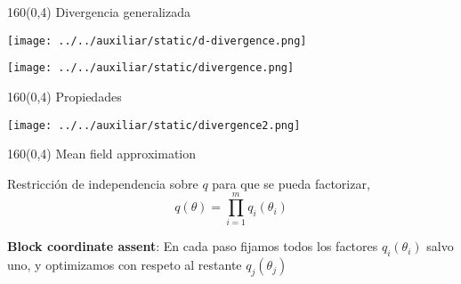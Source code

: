 \documentclass[shownotes,aspectratio=169]{beamer}
\begin{document}
\begin{frame}[plain]
 \begin{textblock}{160}(0,4)
\centering \Large Divergencia generalizada
\end{textblock}
\vspace{0.5cm}


\centering
\texttt{[image: ../../auxiliar/static/d-divergence.png]}

\vspace{0.3cm}

\texttt{[image: ../../auxiliar/static/divergence.png]}
 

\end{frame}


\begin{frame}[plain]
 \begin{textblock}{160}(0,4)
\centering \Large Propiedades
\end{textblock}
\vspace{0.5cm}

\centering
\texttt{[image: ../../auxiliar/static/divergence2.png]}


\end{frame}

\begin{frame}[plain]
 \begin{textblock}{160}(0,4)
\centering \Large Mean field approximation
\end{textblock}
\vspace{0.5cm}

Restricci\'on de independencia sobre $q$ para que se pueda factorizar,
\begin{equation*}
 q(\theta) = \prod_{i=1}^m q_i(\theta_i)
\end{equation*}

\textbf{Block coordinate assent}: En cada paso fijamos todos los factores $q_i(\theta_i)$ salvo uno, y optimizamos con respeto al restante $q_j(\theta_j)$
% 

\end{frame}
\end{document}
